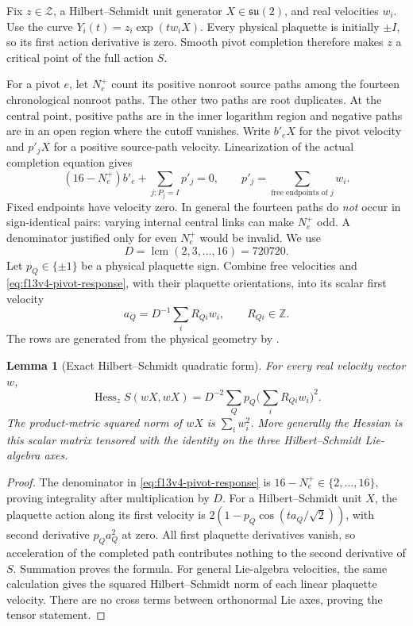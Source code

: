 \documentclass[11pt,oneside]{article}
\newtheorem{lemma}[theorem]{Lemma}
\DeclareMathOperator{\Hess}{Hess}
\begin{document}
Fix \(z\in\mathcal Z\), a Hilbert--Schmidt unit generator
\(X\in\mathfrak{su}(2)\), and real velocities \(w_i\).
Use the curve \(Y_i(t)=z_i\exp(tw_iX)\).
Every physical plaquette is initially \(\pm I\), so
its first action derivative is zero. Smooth pivot
completion therefore makes \(z\) a critical point
of the full action \(S\).

For a pivot \(e\), let \(N_e^+\) count its positive
nonroot source paths among the fourteen chronological
nonroot paths. The other two paths are root duplicates.
At the central point, positive paths are in the inner
logarithm region and negative paths are in an open
region where the cutoff vanishes. Write \(b'_eX\)
for the pivot velocity and \(p'_jX\) for a positive
source-path velocity. Linearization of the actual
completion equation gives
\begin{equation}\label{eq:f13v4-pivot-response}
 (16-N_e^+)b'_e+\sum_{j:P_j=I}p'_j=0,\qquad
 p'_j=\sum_{\text{free endpoints of }j}w_i.
\end{equation}
Fixed endpoints have velocity zero. In general the
fourteen paths do \emph{not} occur in sign-identical
pairs: varying internal central links can make \(N_e^+\)
odd. A denominator justified only for even \(N_e^+\)
would be invalid. We use
\[
 D=\operatorname{lcm}(2,3,\ldots,16)=720720 .
\]
Let \(p_Q\in\{\pm1\}\) be a physical plaquette sign.
Combine free velocities and
\eqref{eq:f13v4-pivot-response}, with their plaquette
orientations, into its scalar first velocity
\[
 a_Q=D^{-1}\sum_iR_{Qi}w_i,\qquad R_{Qi}\in\mathbb Z .
\]
The rows are generated from the physical geometry by
.

\begin{lemma}[Exact Hilbert--Schmidt quadratic form]
\label{lem:f13v4-hessian}
For every real velocity vector \(w\),
\begin{equation}\label{eq:f13v4-hessian}
 \Hess_z S(wX,wX)
   =D^{-2}\sum_Q p_Q\Big(\sum_iR_{Qi}w_i\Big)^2.
\end{equation}
The product-metric squared norm of \(wX\) is
\(\sum_iw_i^2\). More generally the Hessian is this
scalar matrix tensored with the identity on the
three Hilbert--Schmidt Lie-algebra axes.
\end{lemma}

\begin{proof}
The denominator in
\eqref{eq:f13v4-pivot-response} is
\(16-N_e^+\in\{2,\ldots,16\}\), proving integrality
after multiplication by \(D\). For a Hilbert--Schmidt
unit \(X\), the plaquette action along its first
velocity is \(2(1-p_Q\cos(ta_Q/\sqrt2))\), with
second derivative \(p_Qa_Q^2\) at zero.
All first plaquette derivatives vanish, so acceleration
of the completed path contributes nothing to the
second derivative of \(S\). Summation proves the formula.
For general Lie-algebra velocities, the same calculation
gives the squared Hilbert--Schmidt norm of each linear
plaquette velocity. There are no cross terms between
orthonormal Lie axes, proving the tensor statement.
\end{proof}
\end{document}
